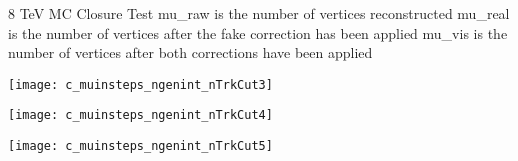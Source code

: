 \documentclass[8pt]{beamer}
\begin{document}
\begin{frame}
\centering
\large{8 TeV MC Closure Test}
\newline
mu\_raw is the number of vertices reconstructed
\newline
mu\_real is the number of vertices after the fake correction has been applied
\newline
mu\_vis is the number of vertices after both corrections have been applied
\end{frame}
\begin{frame}
\center
\texttt{[image: c\_muinsteps\_ngenint\_nTrkCut3]}
\end{frame}
\begin{frame}
\center
\texttt{[image: c\_muinsteps\_ngenint\_nTrkCut4]}
\end{frame}
\begin{frame}
\center
\texttt{[image: c\_muinsteps\_ngenint\_nTrkCut5]}
\end{frame}
\end{document}
